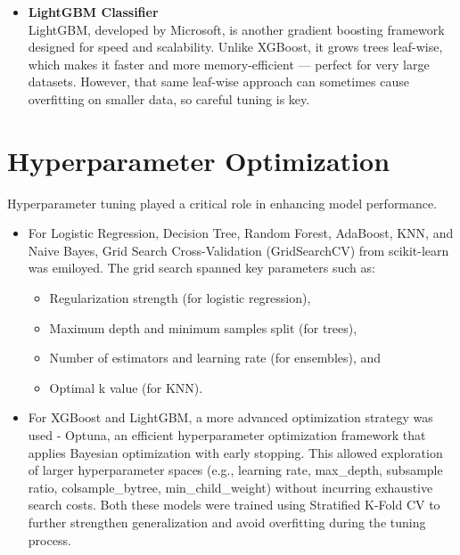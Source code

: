 \begin{itemize}
    \item \textbf{LightGBM Classifier}\\
    LightGBM, developed by Microsoft, is another gradient boosting framework designed for speed and scalability.
    Unlike XGBoost, it grows trees leaf-wise, which makes it faster and more memory-efficient — perfect for very large datasets.
    However, that same leaf-wise approach can sometimes cause overfitting on smaller data, so careful tuning is key.


\end{itemize}


\section{Hyperparameter Optimization}\label{sec:hyperparameter-optimization2}
Hyperparameter tuning played a critical role in enhancing model performance.

\begin{itemize}
    \item For Logistic Regression, Decision Tree, Random Forest, AdaBoost, KNN, and Naive Bayes, Grid Search Cross-Validation (GridSearchCV) from scikit-learn was emiloyed.
    The grid search spanned key parameters such as:
    \begin{itemize}
        \item Regularization strength (for logistic regression),
        \item Maximum depth and minimum samples split (for trees),
        \item Number of estimators and learning rate (for ensembles), and
        \item Optimal k value (for KNN).
    \end{itemize}

    \item For XGBoost and LightGBM, a more advanced optimization strategy was used - Optuna, an efficient hyperparameter optimization framework that applies Bayesian optimization with early stopping.
    This allowed exploration of larger hyperparameter spaces (e.g., learning rate, max\_depth, subsample ratio, colsample\_bytree, min\_child\_weight) without incurring exhaustive search costs.
    Both these models were trained using Stratified K-Fold CV to further strengthen generalization and avoid overfitting during the tuning process.
\end{itemize}


